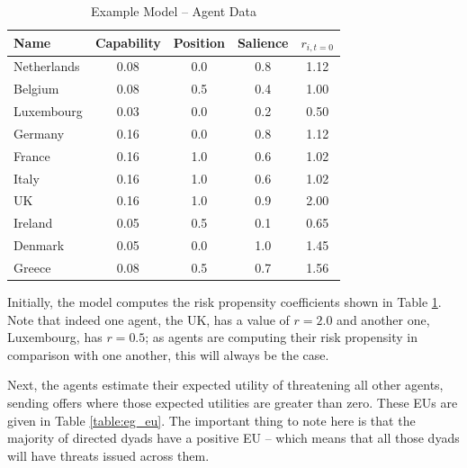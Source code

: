 \begin{table}
\centering
\caption{Example Model -- Agent Data}
\label{table:eg_agent_data}
\begin{tabular}{lccc|c}
    \hline
    Name &  Capability &  Position &  Salience & $r_{i,t=0}$ \\
    \hline
    Netherlands &        0.08 &       0.0 &       0.8 & 1.12 \\
        Belgium &        0.08 &       0.5 &       0.4 & 1.00 \\
     Luxembourg &        0.03 &       0.0 &       0.2 & 0.50 \\
        Germany &        0.16 &       0.0 &       0.8 & 1.12 \\
         France &        0.16 &       1.0 &       0.6 & 1.02 \\
          Italy &        0.16 &       1.0 &       0.6 & 1.02 \\
             UK &        0.16 &       1.0 &       0.9 & 2.00 \\
        Ireland &        0.05 &       0.5 &       0.1 & 0.65 \\
        Denmark &        0.05 &       0.0 &       1.0 & 1.45 \\
         Greece &        0.08 &       0.5 &       0.7 & 1.56 \\
    \hline
\end{tabular}
\tableSpace
\end{table}

Initially, the model computes the risk propensity coefficients shown in Table \ref{table:eg_agent_data}. Note that indeed one agent, the UK, has a value of $r=2.0$ and another one, Luxembourg, has $r=0.5$; as agents are computing their risk propensity in comparison with one another, this will always be the case.

Next, the agents estimate their expected utility of threatening all other agents, sending offers where those expected utilities are greater than zero. These EUs are given in Table \ref{table:eg_eu}. The important thing to note here is that the majority of directed dyads have a positive EU -- which means that all those dyads will have threats issued across them. 

